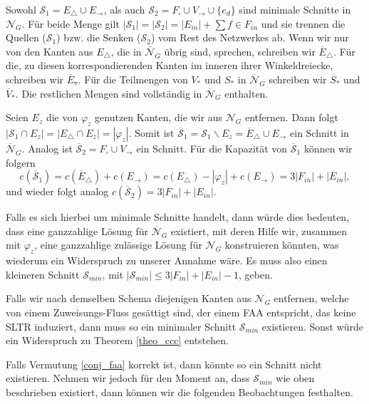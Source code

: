 Sowohl $\mathcal{S}_1 = E_\triangle \cup E_{\to}$, als auch $\mathcal{S}_2 = F_\square \cup V_{\to} \cup \{e_{d}\}$ sind minimale Schnitte in $\mathcal{N}_G$. Für beide Menge gilt $|\mathcal{S}_1| = |\mathcal{S}_2| = |E_{in}| + \sum{f \in F_{in}}$ und sie trennen die Quellen ($\mathcal{S}_1$) bzw. die Senken ($\mathcal{S}_2$) vom Rest des Netzwerkes ab. Wenn wir nur von den Kanten aus $E_\triangle$, die in $\overline{\mathcal{N}}_G$ übrig sind, sprechen, schreiben wir $\overline{E}_\triangle$. Für die, zu diesen korrespondierenden Kanten im inneren ihrer Winkeldreiecke, schreiben wir $\overline{E}_\triangledown$. Für die Teilmengen von $V_*$ und $S_*$ in $\overline{\mathcal{N}}_G$ schreiben wir $\overline{S}_*$ und $\overline{V}_*$. Die restlichen Mengen sind vollständig in $\overline{\mathcal{N}}_G$ enthalten.

Seien $E_z$ die von $\varphi_z$ genutzen Kanten, die wir aus $\mathcal{N}_G$ entfernen. Dann folgt $|\mathcal{S}_1 \cap E_z| = |E_\triangle \cap E_z| = |\varphi_z|$. Somit ist $\overline{\mathcal{S}}_1 = \mathcal{S}_1 \backslash E_z = \overline{E}_\triangle \cup E_\to$ ein Schnitt in $\overline{\mathcal{N}}_G$. Analog ist $\overline{\mathcal{S}}_2 = F_\square \cup V_{\to}$ ein Schnitt. Für die Kapazität von $\overline{\mathcal{S}}_1$ können wir folgern 
$$ c(\overline{\mathcal{S}}_1) = c(\overline{E}_\triangle) + c(E_\to) = c(E_\triangle) - |\varphi_z| + c(E_\to) = 3|F_{in}| + |E_{in}|,$$
und wieder folgt analog $c(\overline{\mathcal{S}}_2) = 3|F_{in}| + |E_{in}|$.

Falls es sich hierbei um minimale Schnitte handelt, dann würde dies bedeuten, dass eine ganzzahlige Lösung für $\overline{\mathcal{N}}_G$ existiert, mit deren Hilfe wir, zusammen mit $\varphi_z$, eine ganzzahlige zulässige Lösung für $\mathcal{N}_G$ konstruieren könnten, was wiederum ein Widerspruch zu unserer Annahme wäre. Es muss also einen kleineren Schnitt $\mathcal{S}_{min}$, mit $|\mathcal{S}_{min}| \leq 3|F_{in}| + |E_{in}| - 1$, geben. 

\begin{remark}
Falls wir nach demselben Schema diejenigen Kanten aus $\mathcal{N}_G$ entfernen, welche von einem Zuweisungs-Fluss gesättigt sind, der einem FAA entspricht, das keine SLTR induziert, dann muss so ein minimaler Schnitt $\mathcal{S}_{min}$ existieren. Sonst würde ein Widerspruch zu Theorem \ref{theo_ccc} entstehen.
\end{remark}

Falls Vermutung \ref{conj_faa} korrekt ist, dann könnte so ein Schnitt nicht existieren. Nehmen wir jedoch für den Moment an, dass $\mathcal{S}_{min}$ wie oben beschrieben existiert, dann können wir die folgenden Beobachtungen festhalten.

